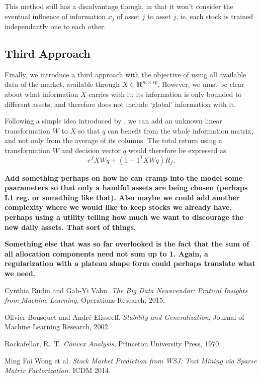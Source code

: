 \documentclass[11pt]{article}
\newcommand{\real}{\bm R}
\theoremstyle{plain}
\theoremstyle{definition}
\begin{document}
This method still has a disadvantage though, in that it won't consider the eventual
influence of information $x_j$ of asset $j$ to asset $j$, ie. each stock is trained
independantly one to each other.

\subsection{Third Approach}

Finally, we introduce a third approach with the objective of using all available data of
the market, available through $X\in\real^{m\times sp}$. However, we must be clear about
what information $X$ carries with it; its information is only bounded to different
assets, and therefore does not include `global' information with it.

Following a simple idea introduced by \cite{wsj}, we can add an unknown linear
transformation $W$ to $X$ so that $q$ can benefit from the whole information matrix, and
not only from the average of its columns. The total return using a transformation $W$ and
decision vector $q$ would therefore be expressed as
\begin{equation}
  r^{T}XWq + (1 - 1^{T}XWq)R_f.
\end{equation}

\textbf{Add something perhaps on how he can cramp into the model some paarameters so that
  only a handful assets are being chosen (perhaps L1 reg. or something like that).  Also
  maybe we could add another complexity where we would like to keep stocks we already
  have, perhaps using a utility telling how much we want to discourage the new daily
  assets. That sort of things.}

\textbf{Something else that was so far overlooked is the fact that the sum of all
  allocation components need not sum up to 1. Again, a regularization with a plateau shape
  form could perhaps translate what we need.}
 

\begin{thebibliography}{99}

  Cynthia Rudin and Gah-Yi Vahn. \textit{The Big Data Newsvendor: Pratical Insights from
    Machine Learning}, Operations Research, 2015.

  Olivier Bousquet and André Elisseeff. \textit{Stability and Generalization}, Journal of
  Machine Learning Research, 2002.

  Rockafellar, R.~T. \emph{Convex Analysis}, Princeton University Press, 1970.

 Ming Fai Wong et al. \emph{Stock Market Prediction from WSJ: Text Mining via
    Sparse Matrix Factorization.} ICDM 2014. 

\end{thebibliography}
\end{document}

